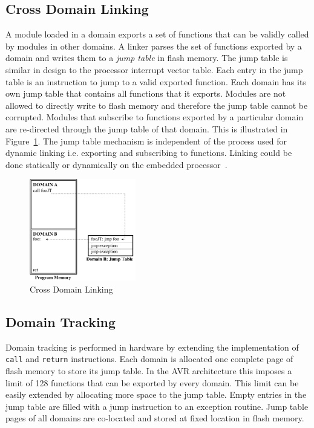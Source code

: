 \subsection{Cross Domain Linking}
%
A module loaded in a domain exports a set of functions that can be validly called by modules in other domains.
%
%
%
A linker parses the set of functions exported by a domain and writes them to a \textit{jump table} in flash memory.
%
The jump table is similar in design to the processor interrupt vector table.
%
Each entry in the jump table is an instruction to jump to a valid exported function.
%
Each domain has its own jump table that contains all functions that it exports. 
%
Modules are not allowed to directly write to flash memory and therefore the jump table cannot be corrupted.
%
Modules that subscribe to functions exported by a particular domain are re-directed through the jump table of that domain.
%
This is illustrated in Figure~\ref{fig:cross_domain_call}.
%
The jump table mechanism is independent of the process used for dynamic linking i.e. exporting and subscribing to functions.
%
Linking could be done statically or dynamically on the embedded processor~\cite{dunkels06linking}.
%
\begin{figure}[htbp]
   \centering
   \includegraphics[height=1.75in, keepaspectratio=true]{figures/cross_domain_call.pdf} 
   \caption{Cross Domain Linking}
   \label{fig:cross_domain_call}
\end{figure}
%
\subsection{Domain Tracking}
%
Domain tracking is performed in hardware by extending the implementation of \texttt{call} and \texttt{return} instructions.
%
Each domain is allocated one complete page of flash memory to store its jump table.
%
In the AVR architecture this imposes a limit of 128 functions that can be exported by every domain.
%
This limit can be easily extended by allocating more space to the jump table.
%
%
Empty entries in the jump table are filled with a jump instruction to an exception routine.
%
Jump table pages of all domains are co-located and stored at fixed location in flash memory.
%

